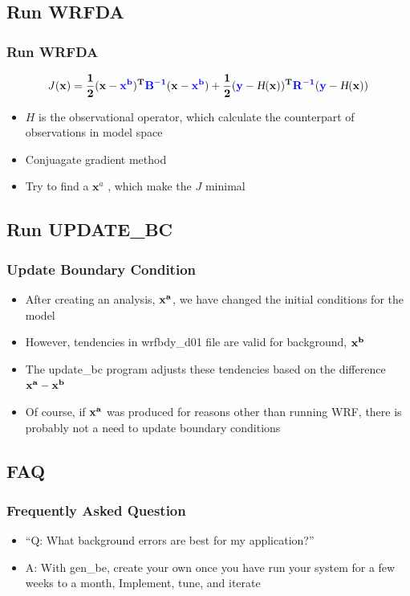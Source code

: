 \documentclass{beamer}
\begin{document}
\subsection{Run WRFDA}
\begin{frame}
\frametitle{Run WRFDA}
\begin{equation*}
J(\bf{x})=\frac{1}{2}(\bf{x}-{\color{blue}\bf{x}^b})^T{\color{blue}\bf{B}^{-1}}(\bf{x}-{\color{blue}\bf{x}^b})+\frac{1}{2}({\color{blue}\bf{y}}-\textsl{H}(\bf{x}))^T{\color{blue}\bf{R}^{-1}}({\color{blue}\bf{y}}-\textsl{H}(\bf{x}))
\end{equation*}
\begin{itemize}
\item $H$ is the observational operator, which calculate the counterpart of observations in model space \pause
\item Conjuagate gradient method
\item Try to find a $\mathbf{x}^a$ , which make the $J$ minimal
\end{itemize}
\end{frame}

\subsection{Run UPDATE\_BC}
\begin{frame}
\frametitle{Update Boundary Condition}
\begin{itemize}
\item After creating an analysis, $\bf{x^a}$, we have changed
the initial conditions for the model \pause
\item However, tendencies in wrfbdy\_d01 file are valid for background, $\bf{x^b}$ \pause
\item The update\_bc program adjusts these tendencies
based on the difference $\bf{x^a - x^b}$ \pause
\item Of course, if $\bf{x^a}$ was produced for reasons other
than running WRF, there is probably not a need to
update boundary conditions
\end{itemize}
\end{frame}

\subsection{FAQ}
\begin{frame}
\frametitle{Frequently Asked Question}
\begin{itemize}
\item“Q: What background errors are best for my application?” \pause
\item \alert{A: With gen\_be, create your own once you have run your
system for a few weeks to a month, Implement, tune, and iterate}
\end{itemize}
\end{frame}
\end{document}
